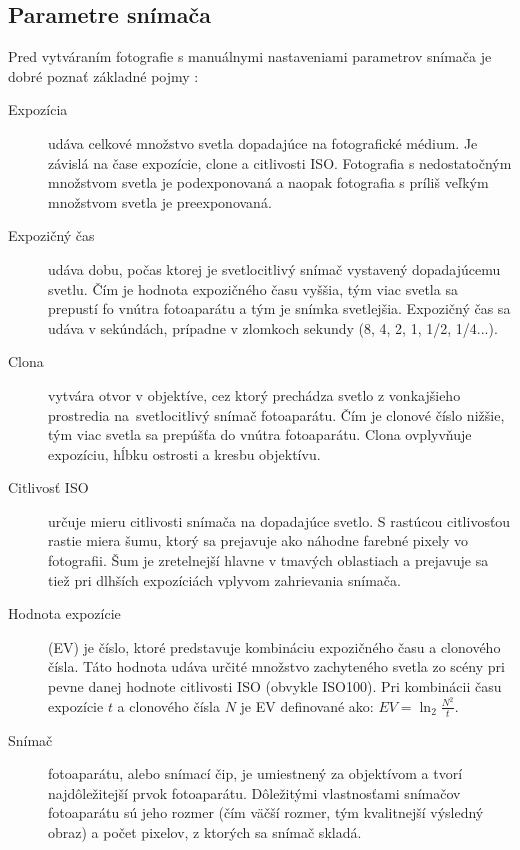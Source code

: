 \subsection{Parametre snímača}

Pred vytváraním fotografie s manuálnymi nastaveniami parametrov snímača je dobré poznať základné pojmy
\cite{ZakladyHDR}\cite{AHDR}:
\begin{description}
    \item [Expozícia] udáva celkové množstvo svetla dopadajúce na fotografické médium. Je závislá na čase expozície,
    clone a citlivosti ISO. Fotografia s nedostatočným množstvom svetla je podexponovaná a naopak fotografia s príliš
    veľkým množstvom svetla je preexponovaná.
    \item [Expozičný čas] udáva dobu, počas ktorej je svetlocitlivý snímač vystavený dopadajúcemu svetlu. Čím je hodnota
    expozičného času vyššia, tým viac svetla sa prepustí fo vnútra fotoaparátu a tým je snímka svetlejšia. Expozičný čas
    sa udáva v sekúndách, prípadne v zlomkoch sekundy (8, 4, 2, 1, 1/2, 1/4...).
    \item [Clona] vytvára otvor v objektíve, cez ktorý prechádza svetlo z vonkajšieho prostredia na~svetlocitlivý snímač
    fotoaparátu. Čím je clonové číslo nižšie, tým viac svetla sa prepúšťa do vnútra fotoaparátu. Clona ovplyvňuje
    expozíciu, hĺbku ostrosti a kresbu objektívu.
    \item [Citlivosť ISO] určuje mieru citlivosti snímača na dopadajúce svetlo. S rastúcou citlivosťou rastie miera šumu,
    ktorý sa prejavuje ako náhodne farebné pixely vo fotografii. Šum je zretelnejší hlavne v tmavých oblastiach a prejavuje
    sa tiež pri dlhších expozíciách vplyvom zahrievania snímača.
    \item [Hodnota expozície] (EV) je číslo, ktoré predstavuje kombináciu expozičného času a clonového čísla. Táto hodnota udáva
    určité množstvo zachyteného svetla zo scény pri pevne danej hodnote citlivosti ISO (obvykle ISO100). Pri kombinácii času
    expozície $t$ a clonového čísla $N$ je EV definované ako:
    $EV = \ln_{2}\frac{N^{2}}{t}$.
    \item [Snímač] fotoaparátu, alebo snímací čip, je umiestnený za objektívom a tvorí najdôležitejší prvok fotoaparátu.
    Dôležitými vlastnosťami snímačov fotoaparátu sú jeho rozmer (čím väčší rozmer, tým kvalitnejší výsledný obraz) a počet
    pixelov, z ktorých sa snímač skladá.


\end{description}
